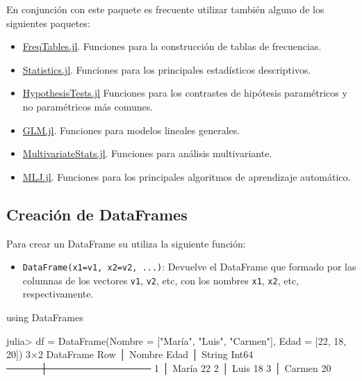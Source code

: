 \documentclass[
  letterpaper,
  DIV=11,
  numbers=noendperiod]{scrreprt}
\newenvironment{Shaded}{\begin{snugshade}}{\end{snugshade}}
\newcommand{\BuiltInTok}[1]{\textcolor[rgb]{0.00,0.23,0.31}{#1}}
\newcommand{\DataTypeTok}[1]{\textcolor[rgb]{0.68,0.00,0.00}{#1}}
\newcommand{\FloatTok}[1]{\textcolor[rgb]{0.68,0.00,0.00}{#1}}
\newcommand{\FunctionTok}[1]{\textcolor[rgb]{0.28,0.35,0.67}{#1}}
\newcommand{\ImportTok}[1]{\textcolor[rgb]{0.00,0.46,0.62}{#1}}
\newcommand{\NormalTok}[1]{\textcolor[rgb]{0.00,0.23,0.31}{#1}}
\newcommand{\OperatorTok}[1]{\textcolor[rgb]{0.37,0.37,0.37}{#1}}
\newcommand{\StringTok}[1]{\textcolor[rgb]{0.13,0.47,0.30}{#1}}
\providecommand{\tightlist}{%
  \setlength{\itemsep}{0pt}\setlength{\parskip}{0pt}}\usepackage{longtable,booktabs,array}
\begin{document}
En conjunción con este paquete es frecuente utilizar también alguno de
los siguientes paquetes:

\begin{itemize}
\tightlist
\item
  \href{https://github.com/nalimilan/FreqTables.jl}{FreqTables.jl}.
  Funciones para la construcción de tablas de frecuencias.
\item
  \href{https://docs.julialang.org/en/v1/stdlib/Statistics/}{Statistics.jl}.
  Funciones para los principales estadísticos descriptivos.
\item
  \href{https://juliastats.org/HypothesisTests.jl/stable/}{HypothesisTests.jl}
  Funciones para los contrastes de hipótesis paramétricos y no
  paramétricos más comunes.
\item
  \href{https://juliastats.org/GLM.jl/stable/}{GLM.jl}. Funciones para
  modelos lineales generales.
\item
  \href{https://multivariatestatsjl.readthedocs.io/en/stable/index.html}{MultivariateStats.jl}.
  Funciones para análisis multivariante.
\item
  \href{https://github.com/alan-turing-institute/MLJ.jl}{MLJ.jl}.
  Funciones para los principales algoritmos de aprendizaje automático.
\end{itemize}

\hypertarget{creaciuxf3n-de-dataframes}{%
\subsection{Creación de DataFrames}\label{creaciuxf3n-de-dataframes}}

Para crear un DataFrame su utiliza la siguiente función:

\begin{itemize}
\tightlist
\item
  \texttt{DataFrame(x1=v1,\ x2=v2,\ ...)}: Devuelve el DataFrame que
  formado por las columnas de los vectores \texttt{v1}, \texttt{v2},
  etc, con los nombres \texttt{x1}, \texttt{x2}, etc, respectivamente.
\end{itemize}

\begin{Shaded}
\begin{Highlighting}[]
\ImportTok{using} \BuiltInTok{DataFrames}

\NormalTok{julia}\OperatorTok{\textgreater{}}\NormalTok{ df }\OperatorTok{=} \FunctionTok{DataFrame}\NormalTok{(Nombre }\OperatorTok{=}\NormalTok{ [}\StringTok{"María"}\NormalTok{, }\StringTok{"Luis"}\NormalTok{, }\StringTok{"Carmen"}\NormalTok{], Edad }\OperatorTok{=}\NormalTok{ [}\FloatTok{22}\NormalTok{, }\FloatTok{18}\NormalTok{, }\FloatTok{20}\NormalTok{])}
\FloatTok{3}\OperatorTok{×}\FloatTok{2}\NormalTok{ DataFrame}
\NormalTok{ Row │ Nombre  Edad  }
\NormalTok{     │ }\DataTypeTok{String}  \DataTypeTok{Int64} 
\NormalTok{─────┼───────────────}
   \FloatTok{1}\NormalTok{ │ María      }\FloatTok{22}
   \FloatTok{2}\NormalTok{ │ Luis       }\FloatTok{18}
   \FloatTok{3}\NormalTok{ │ Carmen     }\FloatTok{20}
\end{Highlighting}
\end{Shaded}
\end{document}
